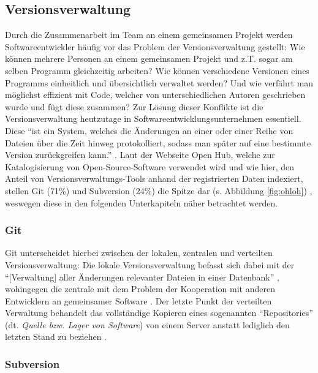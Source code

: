 \subsection{Versionsverwaltung}
Durch die Zusammenarbeit im Team an einem gemeinsamen Projekt werden Softwareentwickler häufig vor das Problem der Versionsverwaltung gestellt: Wie können mehrere Personen an einem gemeinsamen Projekt und z.T. sogar am selben Programm gleichzeitig arbeiten?
Wie können verschiedene Versionen eines Programms einheitlich und übersichtlich verwaltet werden? Und wie verfährt man möglichst effizient mit Code, welcher von unterschiedlichen Autoren geschrieben wurde und fügt diese zusammen? Zur Lösung dieser Konflikte 
ist die Versionsverwaltung heutzutage in Softwareentwicklungsunternehmen essentiell. Diese \enquote{ist ein System, welches die Änderungen an einer oder einer Reihe von Dateien über die Zeit hinweg protokolliert, sodass man später auf eine bestimmte Version 
zurückgreifen kann.} \cite{Scott-Chacon:2020aa}. Laut der Webseite Open Hub, welche zur Katalogisierung von Open-Source-Software verwendet wird und wie hier, den Anteil von Versionsverwaltungs-Tools anhand der registrierten Daten indexiert, stellen Git (71\%) 
und Subversion (24\%) die Spitze dar (s. Abbildung \ref{fig:ohloh}) \cite{Inc.:2020aa}, weswegen diese in den folgenden Unterkapiteln näher betrachtet werden.

\subsubsection{Git}
Git unterscheidet hierbei zwischen der lokalen, zentralen und verteilten Versionsverwaltung: Die lokale Versionsverwaltung befasst sich dabei mit der \enquote{[Verwaltung] aller Änderungen relevanter Dateien in einer Datenbank} \cite{Scott-Chacon:2020aa}, wohingegen die
zentrale mit dem Problem der Kooperation mit anderen Entwicklern an gemeinsamer Software \cite{Scott-Chacon:2020aa}. Der letzte Punkt der verteilten Verwaltung behandelt das vollständige Kopieren eines sogenannten \enquote{Repositories} (dt. \textit{Quelle bzw. Lager von Software})
von einem Server anstatt lediglich den letzten Stand zu beziehen \cite{Scott-Chacon:2020aa}.

\subsubsection{Subversion}
